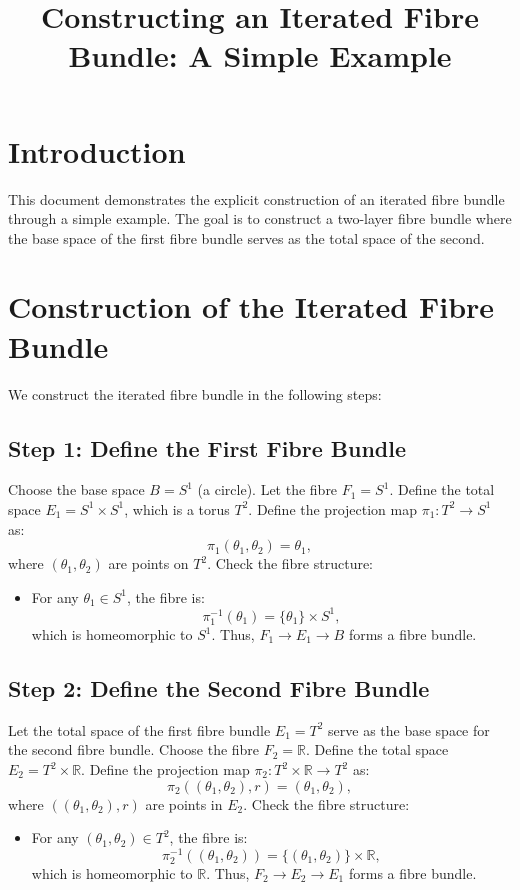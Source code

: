 \documentclass[12pt]{article}
\begin{document}
\title{Constructing an Iterated Fibre Bundle: A Simple Example}
\author{}
\date{}
\maketitle

\section*{Introduction}
This document demonstrates the explicit construction of an iterated fibre bundle through a simple example. The goal is to construct a two-layer fibre bundle where the base space of the first fibre bundle serves as the total space of the second.

\section*{Construction of the Iterated Fibre Bundle}

We construct the iterated fibre bundle in the following steps:

\subsection*{Step 1: Define the First Fibre Bundle}
Choose the base space $B = S^1$ (a circle).
Let the fibre $F_1 = S^1$.
Define the total space $E_1 = S^1 \times S^1$, which is a torus $T^2$.
Define the projection map $\pi_1: T^2 \to S^1$ as:
  \[
  \pi_1(\theta_1, \theta_2) = \theta_1,
  \]
  where $(\theta_1, \theta_2)$ are points on $T^2$.
Check the fibre structure:
  \begin{itemize}
    \item For any $\theta_1 \in S^1$, the fibre is:
      \[
      \pi_1^{-1}(\theta_1) = \{\theta_1\} \times S^1,
      \]
      which is homeomorphic to $S^1$. Thus, $F_1 \to E_1 \to B$ forms a fibre bundle.
  \end{itemize}

\subsection*{Step 2: Define the Second Fibre Bundle}
Let the total space of the first fibre bundle $E_1 = T^2$ serve as the base space for the second fibre bundle.
Choose the fibre $F_2 = \mathbb{R}$.
Define the total space $E_2 = T^2 \times \mathbb{R}$.
Define the projection map $\pi_2: T^2 \times \mathbb{R} \to T^2$ as:
  \[
  \pi_2((\theta_1, \theta_2), r) = (\theta_1, \theta_2),
  \]
  where $((\theta_1, \theta_2), r)$ are points in $E_2$.
Check the fibre structure:
  \begin{itemize}
    \item For any $(\theta_1, \theta_2) \in T^2$, the fibre is:
      \[
      \pi_2^{-1}((\theta_1, \theta_2)) = \{(\theta_1, \theta_2)\} \times \mathbb{R},
      \]
      which is homeomorphic to $\mathbb{R}$. Thus, $F_2 \to E_2 \to E_1$ forms a fibre bundle.
  \end{itemize}
\end{document}

